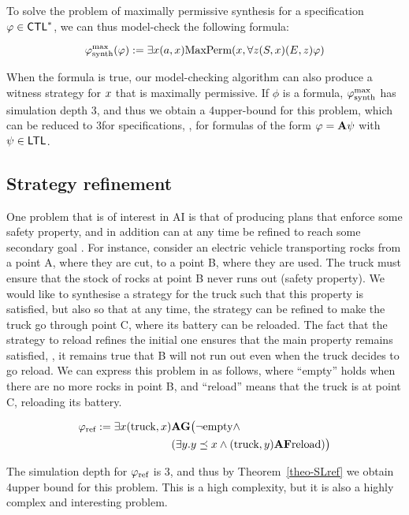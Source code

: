 To solve the problem of maximally permissive synthesis for a specification $\phi\in\CTLs$,  we can thus model-check the
following \SLref formula:

\[\phisynthmp(\phi):=\exists\var (\ag,\var) \maxperm(\var,\forall \varc
  \bind[S]{\var}\bind[E]{\varc}\phi)\]

When the formula is true, our model-checking algorithm can also
produce a witness strategy for $\var$ that is maximally permissive.
If $\phi$ is a \CTLs formula, $\phisynthmp$ has simulation depth 3,
and thus we obtain a 4\EXPTIME upper-bound for this problem, which can
be reduced to 3\EXPTIME for \LTL specifications, \ie, for formulas of
the form $\phi=\A\psi$ with $\psi\in\LTL$.



\subsection{Strategy refinement}
\label{sec-plan-B}

One problem that is of interest in AI is
that of producing plans that enforce some safety property, and in addition
can at any time be refined to reach some secondary goal \cite{WrightMN18,PercassiG19}. For instance,
consider an electric vehicle transporting rocks from a point A, where
they are cut, to a point B, where they are used. The truck must ensure
that the stock of rocks at point B never runs out (safety property). We would like to synthesise a
strategy for the truck such that  this property is satisfied, but also
so that at any time, the strategy can be refined  to make the truck go
through point C, where its battery can be reloaded. The fact that the
strategy to reload refines the initial one ensures that the main
property remains satisfied, \ie, it remains true that B will not run
out even when the truck decides to go reload.
We can express  this problem in \SLref as follows, where ``empty''
holds when there are no more rocks in point B, and ``reload'' means
that the truck is at point C, reloading its battery.

\begin{align*}
\phireload:=\exists\var (\text{truck},\var) & \A \always \big ( \neg
                                              \text{empty} \wedge \\
&  (\exists \varb. \varb\refines\var \wedge (\text{truck},\varb)\A\F \text{reload}) \big )  
\end{align*}

The simulation depth for $\phireload$ is 3, and thus by
Theorem~\ref{theo-SLref} we obtain 4\EXPTIME upper bound for this
problem. This is a high complexity, but it is also a highly complex
and interesting problem.

